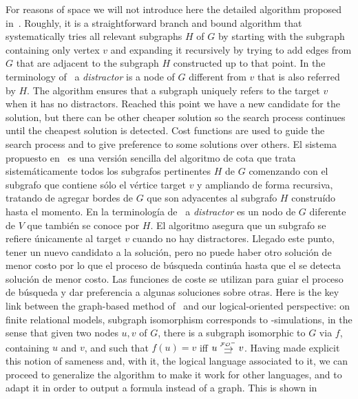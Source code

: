 For reasons of space we will not introduce here the detailed algorithm proposed
in~\cite{Krahmer2003}. Roughly, it is a
straightforward branch and bound algorithm that systematically tries all
relevant subgraphs $H$ of $G$ by starting with the subgraph
containing only vertex $v$ and expanding it recursively by trying to
add edges from $G$ that are adjacent to the subgraph $H$ constructed
up to that point. In the terminology
of~\cite{Krahmer2003} a {\em distractor} is a node of $G$ different from
$v$ that is also referred by $H$.
The algorithm ensures that a subgraph uniquely refers to the
target $v$ when it has no distractors. Reached this point we
have a new candidate for the solution, but there can be other
cheaper solution so the search process continues until the
cheapest solution is detected. Cost functions are used to
guide the search process and to give preference to some solutions
over others.
%
El sistema propuesto en~\cite{Krahmer2003} es una
versi\'on sencilla del algoritmo de cota que trata sistem\'aticamente todos los
subgrafos pertinentes $H$ de $G$ comenzando con el subgrafo
que contiene s\'olo el v\'ertice target $v$ y ampliando de forma recursiva, tratando de
agregar bordes de $G$ que son adyacentes al subgrafo $H$ constru\'ido
hasta el momento. En la terminolog\'ia de~\cite{Krahmer2003} a {\em distractor} es un nodo de $G$ diferente de
$V$ que tambi\'en se conoce por $H$.
El algoritmo asegura que un subgrafo se refiere \'unicamente al target $v$ cuando no hay distractores. Llegado este punto,
tener un nuevo candidato a la soluci\'on, pero no puede haber otro
soluci\'on de menor costo por lo que el proceso de b\'usqueda contin\'ua hasta que el
se detecta soluci\'on de menor costo. Las funciones de coste se utilizan para
guiar el proceso de b\'usqueda y dar preferencia a algunas soluciones
sobre otras.
Here is the key link between the graph-based method
of~\cite{Krahmer2003} and our logical-oriented perspective: on
finite relational models, subgraph isomorphism corresponds to
\EPFOL-simulations, in the sense that given two nodes $u,v$ of
$G$, there is a subgraph isomorphic to $G$ via $f$, containing $u$ and
$v$, and such that $f(u)=v$ iff $u \simul{\+\EPFOL} v$.
%
Having made explicit this notion of sameness and, with it, the
logical language associated to it, we can proceed to generalize the
algorithm to make it work for other languages, and to adapt it in
order to output a formula instead of a graph. This is shown in


